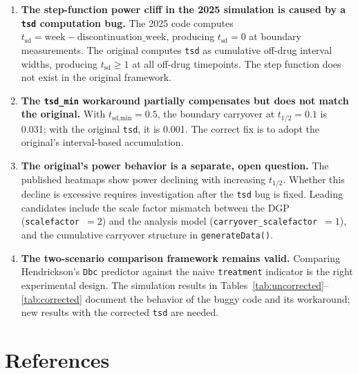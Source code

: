 \documentclass[11pt]{article}
\begin{document}
\begin{enumerate}
  \item \textbf{The step-function power cliff in the 2025 simulation
    is caused by a \texttt{tsd} computation bug.} The 2025 code
    computes $t_{\text{sd}} = \text{week} - \text{discontinuation\_week}$,
    producing $t_{\text{sd}} = 0$ at boundary measurements. The
    original computes \texttt{tsd} as cumulative off-drug interval
    widths, producing $t_{\text{sd}} \geq 1$ at all off-drug
    timepoints. The step function does not exist in the original
    framework.

  \item \textbf{The \texttt{tsd\_min} workaround partially
    compensates but does not match the original.} With
    $t_{\text{sd,min}} = 0.5$, the boundary carryover at
    $t_{1/2} = 0.1$ is 0.031; with the original \texttt{tsd}, it is
    0.001. The correct fix is to adopt the original's interval-based
    accumulation.

  \item \textbf{The original's power behavior is a separate, open
    question.} The published heatmaps show power declining with
    increasing $t_{1/2}$. Whether this decline is excessive requires
    investigation after the \texttt{tsd} bug is fixed. Leading
    candidates include the scale factor mismatch between the DGP
    (\texttt{scalefactor}~$= 2$) and the analysis model
    (\texttt{carryover\_scalefactor}~$= 1$), and the cumulative
    carryover structure in \texttt{generateData()}.

  \item \textbf{The two-scenario comparison framework remains valid.}
    Comparing Hendrickson's \texttt{Dbc} predictor against the naive
    \texttt{treatment} indicator is the right experimental design.
    The simulation results in
    Tables~\ref{tab:uncorrected}--\ref{tab:corrected} document the
    behavior of the buggy code and its workaround; new results with
    the corrected \texttt{tsd} are needed.
\end{enumerate}

\section*{References}
\end{document}
